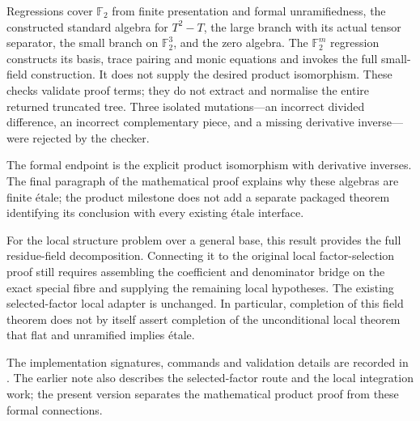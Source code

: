 \documentclass[11pt]{article}
\theoremstyle{definition}
\theoremstyle{remark}
\begin{document}
Regressions cover $\mathbb F_2$ from finite presentation and formal
unramifiedness, the constructed standard algebra for $T^2-T$,
the large branch with its actual tensor separator, the small branch
on $\mathbb F_2^3$, and the zero algebra. The $\mathbb F_2^m$
regression constructs its basis, trace pairing and monic equations
and invokes the full small-field construction. It does not supply the
desired product isomorphism. These checks validate proof terms;
they do not extract and normalise the entire returned truncated tree.
Three isolated mutations---an incorrect divided difference, an
incorrect complementary piece, and a missing derivative inverse---were
rejected by the checker.

The formal endpoint is the explicit product isomorphism with derivative
inverses. The final paragraph of the mathematical proof explains why
these algebras are finite \'etale; the product milestone does not add
a separate packaged theorem identifying its conclusion with every
existing \'etale interface.

For the local structure problem over a general base, this result
provides the full residue-field decomposition. Connecting it to the
original local factor-selection proof still requires assembling the
coefficient and denominator bridge on the exact special fibre and
supplying the remaining local hypotheses. The existing selected-factor
local adapter is unchanged. In particular, completion
of this field theorem does not by itself assert completion of the
unconditional local theorem that flat and unramified implies \'etale.

The implementation signatures, commands and validation details are
recorded in .
The earlier note  also describes the
selected-factor route and the local integration work; the present
version separates the mathematical product proof from these formal
connections.
\end{document}

